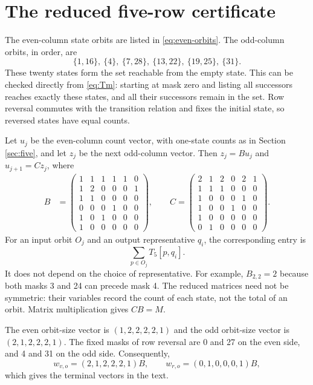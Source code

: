 \section{The reduced five-row certificate}\label{app:certificate}

The even-column state orbits are listed in
\eqref{eq:even-orbits}. The odd-column orbits, in order, are
\[
 \{1,16\},\ \{4\},\ \{7,28\},\ \{13,22\},\
 \{19,25\},\ \{31\}.
\]
These twenty states form the set reachable from the empty
state. This can be checked directly from \eqref{eq:Tm}:
starting at mask zero and listing all successors reaches
exactly these states, and all their successors remain in
the set. Row reversal commutes with the transition relation
and fixes the initial state, so reversed states have equal
counts.

Let $u_j$ be the even-column count vector, with one-state
counts as in Section \ref{sec:five}, and let $z_j$ be the next
odd-column vector. Then $z_j=Bu_j$ and $u_{j+1}=Cz_j$, where
\begin{equation}\label{eq:BC}
\begin{split}
 B&=\begin{pmatrix}
1&1&1&1&1&0\\
1&2&0&0&0&1\\
1&1&0&0&0&0\\
0&0&0&1&0&0\\
1&0&1&0&0&0\\
1&0&0&0&0&0
\end{pmatrix},\qquad
 C=\begin{pmatrix}
2&1&2&0&2&1\\
1&1&1&0&0&0\\
1&0&0&0&1&0\\
1&0&0&1&0&0\\
1&0&0&0&0&0\\
0&1&0&0&0&0
\end{pmatrix}.
\end{split}
\end{equation}
For an input orbit $O_j$ and an output representative $q_i$,
the corresponding entry is
\[
\sum_{p\in O_j}T_5[p,q_i].
\]
It does not depend on the choice of representative.
For example, $B_{2,2}=2$ because both masks 3 and 24
can precede mask 4.
The reduced matrices need not be symmetric:
their variables record the count of each state, not the
total of an orbit. Matrix multiplication gives $CB=M$.

The even orbit-size vector is $(1,2,2,2,2,1)$ and the odd
orbit-size vector is $(2,1,2,2,2,1)$.
The fixed masks of row reversal are 0 and 27 on the even side,
and 4 and 31 on the odd side. Consequently,
\[
 w_{v,o}=(2,1,2,2,2,1)B,\qquad
 w_{r,o}=(0,1,0,0,0,1)B,
\]
which gives the terminal vectors in the text.

